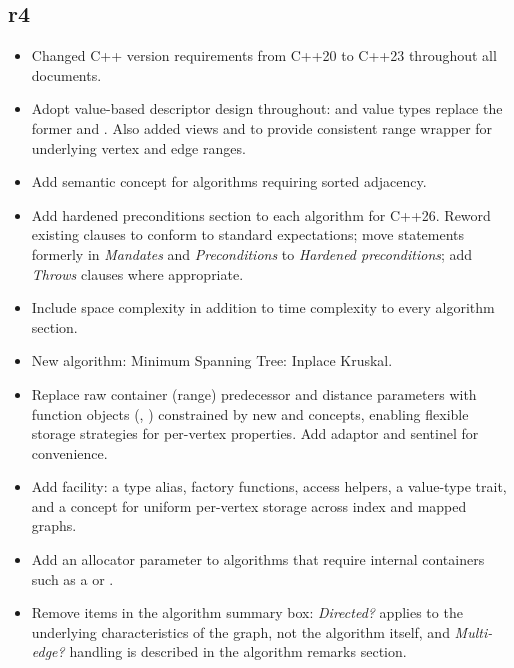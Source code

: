 \subsection*{\paperno r4}
\begin{itemize}
      \item Changed C++ version requirements from C++20 to C++23 throughout all documents.
      \item Adopt value-based descriptor design throughout:  and 
            value types replace the former  and .
            Also added views  and 
            to provide consistent range wrapper for underlying vertex and edge ranges.
      \item Add  semantic concept for algorithms requiring sorted adjacency.
      \item Add hardened preconditions section to each algorithm for C++26.  Reword
            existing clauses to conform to standard expectations; move statements formerly in
            \textit{Mandates} and \textit{Preconditions} to \textit{Hardened preconditions};
            add \textit{Throws} clauses where appropriate.
      \item Include space complexity in addition to time complexity to every algorithm section.
      \item New algorithm: Minimum Spanning Tree: Inplace Kruskal.
      \item Replace raw container (range) predecessor and distance parameters with function objects
            (, ) constrained by new  and
             concepts, enabling flexible storage strategies for per-vertex properties.
            Add  adaptor and  sentinel for convenience.
      \item Add  facility: a type alias, factory functions, access helpers,
            a value-type trait, and a concept for uniform per-vertex storage across index and mapped graphs.
      \item Add an allocator parameter to algorithms that require internal containers such as a 
            or .
      \item Remove items in the algorithm summary box: \textit{Directed?} applies to the underlying characteristics 
            of the graph, not the algorithm itself, and \textit{Multi-edge?} handling is described in the algorithm 
            remarks section.
\end{itemize}
